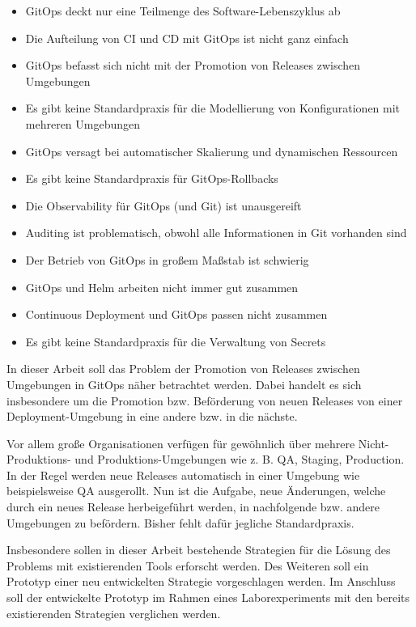 \begin{itemize}
	\item GitOps deckt nur eine Teilmenge des Software-Lebenszyklus ab
	\item Die Aufteilung von CI und CD mit GitOps ist nicht ganz einfach
	\item GitOps befasst sich nicht mit der Promotion von Releases zwischen Umgebungen
	\item Es gibt keine Standardpraxis für die Modellierung von Konfigurationen mit mehreren Umgebungen
	\item GitOps versagt bei automatischer Skalierung und dynamischen Ressourcen
	\item Es gibt keine Standardpraxis für GitOps-Rollbacks
	\item Die Observability für GitOps (und Git) ist unausgereift
	\item Auditing ist problematisch, obwohl alle Informationen in Git vorhanden sind
	\item Der Betrieb von GitOps in großem Maßstab ist schwierig
	\item GitOps und Helm arbeiten nicht immer gut zusammen
	\item Continuous Deployment und GitOps passen nicht zusammen
	\item Es gibt keine Standardpraxis für die Verwaltung von Secrets
\end{itemize}

\autocite{codefreshGitopsPains10}
\bigskip




In dieser Arbeit soll das Problem der
Promotion von Releases zwischen Umgebungen in GitOps
näher betrachtet werden.
Dabei handelt es sich insbesondere um
die Promotion bzw. Beförderung von neuen Releases
von einer Deployment-Umgebung in eine andere bzw. in die nächste.
\bigskip

Vor allem große Organisationen verfügen für gewöhnlich über mehrere
Nicht-Produktions- und Produktions-Umgebungen
wie z. B. QA, Staging, Production.
In der Regel werden neue Releases automatisch in einer Umgebung
wie beispielsweise QA ausgerollt.
Nun ist die Aufgabe,
neue Änderungen, welche durch ein neues Release herbeigeführt werden,
in nachfolgende bzw. andere Umgebungen zu befördern.
Bisher fehlt dafür jegliche Standardpraxis.
\bigskip

Insbesondere sollen in dieser Arbeit
bestehende Strategien für die Lösung des Problems
mit existierenden Tools
erforscht werden.
Des Weiteren soll ein Prototyp einer neu entwickelten
Strategie vorgeschlagen werden.
Im Anschluss soll der entwickelte Prototyp
im Rahmen eines Laborexperiments
mit den bereits existierenden Strategien
verglichen werden.
\bigskip

